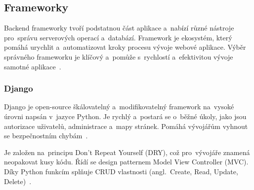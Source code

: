 \documentclass[twoside]{ctuthesis}
\begin{document}
%

\newpage

\subsection{Frameworky}

Backend frameworky tvoří podstatnou část aplikace a~nabízí různé nástroje pro~správu serverových operací a~databází. Framework je ekosystém, který pomáhá urychlit a~automatizovat kroky procesu vývoje webové aplikace. Výběr správného frameworku je klíčový a~pomůže s~rychlostí a~efektivitou vývoje samotné aplikace~\cite{radix}.

\subsubsection*{Django}

Django je open-source škálovatelný a~modifikovatelný framework na~vysoké úrovni napsán v~jazyce Python. Je rychlý a~postará se o~běžné úkoly, jako jsou autorizace uživatelů, administrace a~mapy stránek. Pomáhá vývojářům vyhnout se bezpečnostním chybám~\cite{django}. 

Je založen na~principu Don't Repeat Yourself (DRY), což pro~vývojáře znamená neopakovat kusy kódu. Řídí se design patternem Model View Controller (MVC). Díky Python funkcím splňuje CRUD vlastnosti (angl.~Create, Read, Update, Delete)~\cite{frameworks}. 
\end{document}
